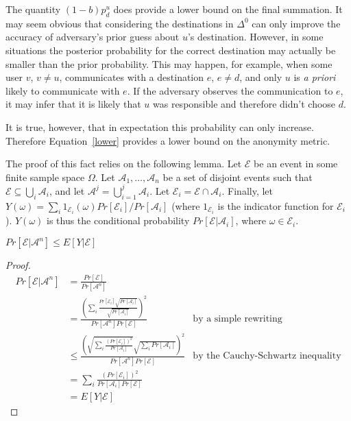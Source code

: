 \documentclass[prodmode,acmtissec]{acmsmall}
\begin{document}
The quantity $(1-b)p^u_d$ does provide a lower bound on the final summation.  It may seem obvious that considering the destinations in $\Delta^0$ can only improve the accuracy of adversary's prior guess about $u$'s destination.  However, in some situations the posterior probability for the correct destination may actually be smaller than the prior probability.  This may happen, for example, when some user $v$, $v\neq u$, communicates with a destination $e$, $e\neq d$, and only $u$ is \emph{a priori} likely to communicate with $e$.  If the adversary observes the communication to $e$, it may infer that it is likely that $u$ was responsible and therefore didn't choose $d$.

It is true, however, that in expectation this probability can only increase.  Therefore Equation~\ref{lower} provides a lower bound on the anonymity metric.

The proof of this fact relies on the following lemma.  Let $\mathcal{E}$ be an event in some finite sample space $\Omega$.  Let $\mathcal{A}_1,\ldots ,\mathcal{A}_n$ be a set of disjoint events such that $\mathcal{E} \subseteq \bigcup_i \mathcal{A}_i$, and let $\mathcal{A}^j = \bigcup_{i=1}^j \mathcal{A}_i$.  Let $\mathcal{E}_i = \mathcal{E}\cap \mathcal{A}_i$.  Finally, let $Y(\omega) = \sum_i 1_{\mathcal{E}_i}(\omega) Pr[\mathcal{E}_i]/Pr[\mathcal{A}_i]$ (where $1_{\mathcal{E}_i}$ is the indicator function for $\mathcal{E}_i$). $Y(\omega)$ is thus the conditional probability $Pr[\mathcal{E} | \mathcal{A}_i]$, where $\omega \in \mathcal{E}_i$.

\begin{lemma} \label{minlem}
$Pr[\mathcal{E} | \mathcal{A}^n] \le E[Y | \mathcal{E}]$
\end{lemma}
\begin{proof}
\begin{displaymath}
\begin{array}{lll}
Pr[\mathcal{E} | \mathcal{A}^n] &=  \frac{Pr[\mathcal{E}]}{Pr[\mathcal{A}^n]}&\\
&= \frac{\left( \sum_i \frac{Pr[\mathcal{E}_i] \sqrt{Pr[\mathcal{A}_i]}}{\sqrt{Pr[\mathcal{A}_i]}} \right)^2}{Pr[\mathcal{A}^n] Pr[\mathcal{E}]}& \textrm{by a simple rewriting}\\
&\le \frac{\left( \sqrt{\sum_i \frac{(Pr[\mathcal{E}_i])^2}{Pr[\mathcal{A}_i]}}\sqrt{\sum_i Pr[\mathcal{A}_i]} \right)^2}{Pr[\mathcal{A}^n] Pr[\mathcal{E}]} & \textrm{by the Cauchy-Schwartz inequality}\\
&= \sum_i \frac{(Pr[\mathcal{E}_i])^2}{Pr[\mathcal{A}_i] Pr[\mathcal{E}]}\\
&= E[Y | \mathcal{E}]
\end{array}
\end{displaymath}
\end{proof}
\end{document}
